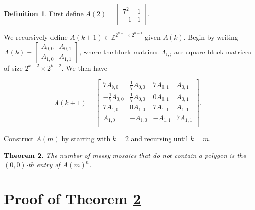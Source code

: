 \documentclass[12pt]{article}
\theoremstyle{plain}
\newtheorem{thm}{Theorem}
\theoremstyle{definition}
\newtheorem{defn}[thm]{Definition}
\theoremstyle{remark}
\theoremstyle{definition}
\begin{document}
\begin{defn}

First define $A(2) = \begin{bmatrix}
7^2 & 1 \\
-1 & 1
\end{bmatrix}$. 

We recursively define $A(k+1) \in \mathbb{Z}^{2^{n-1} \times 2^{n-1}}$ given $A(k)$. Begin by writing
$
A(k) = \begin{bmatrix}
A_{0,0} & A_{0,1} \\
A_{1,0} & A_{1,1}
\end{bmatrix}
$, where the block matrices $A_{i,j}$ are square block matrices of size $2^{k-2} \times 2^{k-2}$. We then have

$$
A(k+1) = \begin{bmatrix}
    7A_{0,0} & \frac{1}{7}A_{0,0} & 7A_{0,1} & A_{0,1} \\
    -\frac{1}{7}A_{0,0} & \frac{1}{7}A_{0,0} & 0A_{0,1} & A_{0,1} \\
    7A_{1,0} & 0A_{1,0} & 7A_{1,1}  & A_{1,1} \\
    A_{1,0} & -A_{1,0} & -A_{1,1} & 7A_{1,1} \\
\end{bmatrix}.
$$

Construct $A(m)$ by starting with $k=2$ and recursing until $k=m$. 

\end{defn}

\begin{thm}
\label{thm: messy mosaics}
The number of messy mosaics that \textit{do not} contain a polygon is the $(0,0)$-th entry of $A(m)^n$.
\end{thm}

\section{Proof of Theorem \ref{thm: messy mosaics}}
\end{document}
